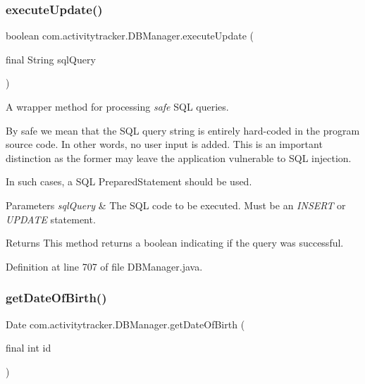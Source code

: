 \subsubsection{\texorpdfstring{execute\+Update()}{executeUpdate()}}
{\footnotesize\ttfamily boolean com.\+activitytracker.\+D\+B\+Manager.\+execute\+Update (\begin{DoxyParamCaption}\item[{final String}]{sql\+Query }\end{DoxyParamCaption})\hspace{0.3cm}{\ttfamily [private]}}

A wrapper method for processing {\itshape safe} S\+QL queries.

By safe we mean that the S\+QL query string is entirely hard-\/coded in the program source code. In other words, no user input is added. This is an important distinction as the former may leave the application vulnerable to S\+QL injection.

In such cases, a S\+QL Prepared\+Statement should be used.


\begin{DoxyParams}{Parameters}
{\em sql\+Query} & The S\+QL code to be executed. Must be an {\itshape I\+N\+S\+E\+RT} or {\itshape U\+P\+D\+A\+TE} statement.\\
\hline
\end{DoxyParams}
\begin{DoxyReturn}{Returns}
This method returns a boolean indicating if the query was successful. 
\end{DoxyReturn}


Definition at line 707 of file D\+B\+Manager.\+java.

\mbox{\label{classcom_1_1activitytracker_1_1_d_b_manager_a0576baf67b45c7d2d0ba369052e4404e}} 
\subsubsection{\texorpdfstring{get\+Date\+Of\+Birth()}{getDateOfBirth()}}
{\footnotesize\ttfamily Date com.\+activitytracker.\+D\+B\+Manager.\+get\+Date\+Of\+Birth (\begin{DoxyParamCaption}\item[{final int}]{id }\end{DoxyParamCaption})}

